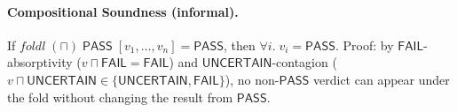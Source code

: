 \documentclass[acmsmall,review,anonymous]{acmart}
\newcommand{\PASS}{\ensuremath{\mathsf{PASS}}\xspace}
\newcommand{\FAIL}{\ensuremath{\mathsf{FAIL}}\xspace}
\newcommand{\UNCERTAIN}{\ensuremath{\mathsf{UNCERTAIN}}\xspace}
\newcommand{\tand}{\sqcap}
\begin{document}
\paragraph{Compositional Soundness (informal).}
If $\mathit{foldl}\;(\tand)\;\PASS\;[v_1, \ldots, v_n] = \PASS$,
then $\forall i.\; v_i = \PASS$.
Proof: by \FAIL-absorptivity ($v \tand \FAIL = \FAIL$) and
\UNCERTAIN-contagion ($v \tand \UNCERTAIN \in \{\UNCERTAIN, \FAIL\}$),
no non-\PASS{} verdict can appear under the fold without changing the
result from \PASS.





\end{document}
